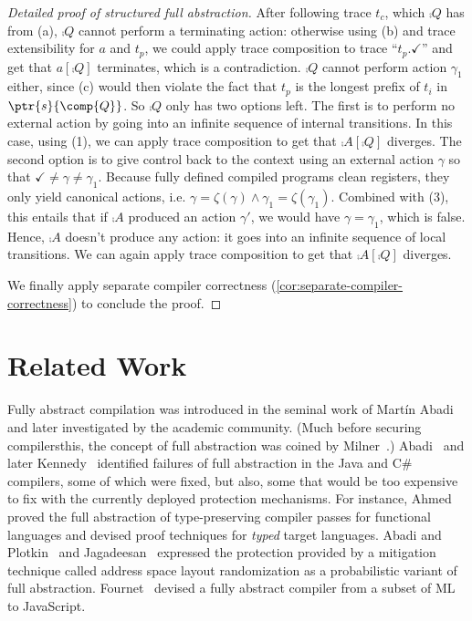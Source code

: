 \documentclass[10pt, conference, compsocconf, letterpaper, times]{IEEEtran}
\begin{document}
\begin{proof}[Detailed proof of structured full abstraction]
After following trace $t_c$, which $\comp{Q}$ has from (a), $\comp{Q}$
cannot perform a terminating action:
otherwise using (b) and trace extensibility for $a$ and $t_p$, we
could apply trace composition to trace ``$t_p.\checkmark$'' and get that
$a[\comp{Q}]$ terminates, which is a contradiction.
$\comp{Q}$ cannot perform action $\gamma_1$ either, since (c) would
then violate the fact that $t_p$ is the longest prefix of $t_i$ in
$\ptr{s}{\comp{Q}}$.
So $\comp{Q}$ only has two options left.
The first is to perform no external action by
going into an infinite sequence of internal transitions.
In this case, using (1), we can apply trace composition to get that
$\comp{A}[\comp{Q}]$ diverges.
The second option is to give control back to the context using
an external action $\gamma$ so that
$\checkmark \neq \gamma \neq \gamma_1$.
Because fully defined compiled programs clean registers, they only
yield canonical actions, i.e.
$\gamma = \zeta(\gamma) \wedge \gamma_1 = \zeta(\gamma_1)$.
Combined with (3), this entails that if $\comp{A}$ produced an
action $\gamma'$, we would have $\gamma = \gamma_1$, which is
false.
Hence, $\comp{A}$ doesn't produce any action: it goes into an infinite
sequence of local transitions.
We can again apply trace composition to get that
$\comp{A}[\comp{Q}]$ diverges.

We finally apply separate compiler correctness
(\autoref{cor:separate-compiler-correctness}) to conclude the proof.
\end{proof}

\section{Related Work}
\label{sec:related}

\iffull
{}
\fi


Fully abstract compilation was introduced in the seminal work of
Mart\'in Abadi~\cite{abadi_protection98}
and later investigated by the academic community.
(Much before \iffull securing compilers\else this\fi,
 the concept of full abstraction
 was coined by Milner~\cite{Milner75}.)
\iffull
Abadi~\cite{abadi_protection98} and later Kennedy~\cite{Kennedy06}
identified failures of full abstraction in the Java and C\# compilers,
some of which were fixed, but also, some that would be too expensive to
fix with the currently deployed protection mechanisms.
\fi
\iffull\else For instance, \fi
Ahmed~\ETAL\cite{AhmedB08,AhmedB11, Ahmed15, NewBA16} proved the
full abstraction of type-preserving compiler passes for functional
languages and devised proof techniques for {\em typed} target languages.
Abadi and Plotkin~\cite{abadi_aslr12} and
Jagadeesan~\ETAL\cite{JagadeesanPRR11} expressed the protection
provided by a mitigation technique called address space layout
randomization as a probabilistic variant of full abstraction.
Fournet~\ETAL\cite{FournetSCDSL13} devised a fully abstract compiler
from a subset of ML to JavaScript.
\end{document}

